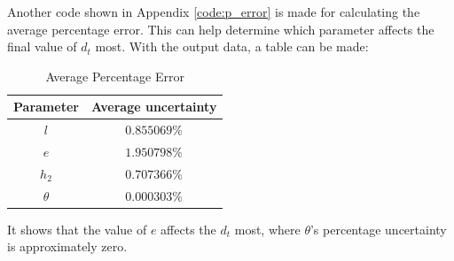 \documentclass{article}
\begin{document}
    Another code shown in Appendix \ref{code:p_error} is made for calculating the average percentage error. This can help determine which parameter affects the final value of $d_t$ most. With the output data, a table can be made:
    
    \begin{table}[H]
        \caption {Average Percentage Error} \label{tb:a_p_e} 
        \begin{center}
            \begin{tabular}{cc}
                \hline
                Parameter & Average uncertainty \\
                \hline
                $l$         & $0.855069\%$     \\
                $e$         & $1.950798\%$     \\
                $h_2$       & $0.707366\%$     \\
                $\theta$    & $0.000303\%$     \\
                \hline
            \end{tabular}
        \end{center}
    \end{table}
    It shows that the value of $e$ affects the $d_t$ most, where $\theta$'s percentage uncertainty is approximately zero. 
\end{document}

